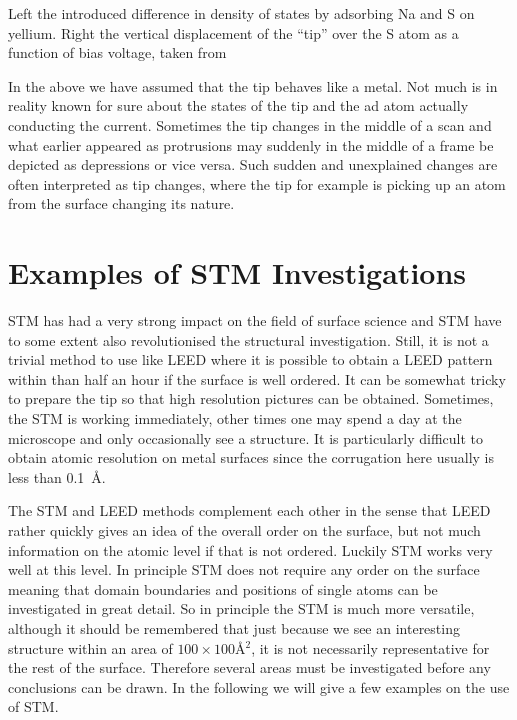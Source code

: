 \vspace*{11cm}

 Left the introduced difference in density of states by adsorbing Na and S on yellium. Right the vertical displacement of the ``tip'' over the S atom as a function of bias voltage, taken from \cite{Lang}

\vspace{1cm}  

In the above we have assumed that the tip behaves like a metal. Not much is in reality known for sure about the states of the tip and the ad atom actually conducting the current. Sometimes the tip changes in the middle of a scan and what earlier appeared as protrusions may suddenly in the middle of a frame be  depicted as depressions or vice versa. Such sudden and unexplained changes are often interpreted as tip changes, where the tip for example is picking up an atom  from the surface changing its nature.

\section{Examples of STM Investigations}
STM has had a very strong impact on the field of surface science and STM have to some extent also revolutionised the structural investigation. Still, it is not a trivial method to use like LEED where it is possible to obtain a LEED pattern within than half an hour if the surface is well ordered. It can be somewhat tricky to prepare the tip so that high resolution pictures can be  obtained. Sometimes, the STM  is working immediately, other times one may spend a day at the microscope and only occasionally see a structure. It is particularly difficult to obtain atomic resolution on metal surfaces since the corrugation here usually is less than \SI{0.1}{\angstrom}.

The STM and LEED methods complement each other in the sense that LEED rather quickly gives an idea of the overall order on the surface, but not much information on the atomic level if that is not ordered. Luckily STM works very well at this level. In principle STM does not require any order on the surface meaning that domain boundaries and positions of single atoms can be investigated in great detail. So in principle the STM is much more versatile, although it should be remembered that just because we see an interesting structure within an area of $100\times 100 \si{\angstrom^2}$, it is not necessarily representative for the rest of the surface. Therefore several areas must  be investigated before any conclusions can be drawn. In the following we will give a few examples on the use of STM.

